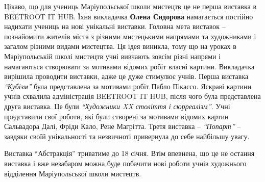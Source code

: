 Цікаво, що  для учениць Маріупольської школи мистецтв це не перша виставка в
BEETROOT IT HUB. Їхня викладачка \textbf{Олена Сидорова} намагається постійно надихати
учениць на нові унікальні виставки. Головна мета виставок – познайомити жителів
міста з різними мистецькими  напрямами та художниками і загалом різними видами
мистецтва. Ця ідея виникла, тому що на уроках в Маріупольській школі мистецтв
учні вивчають зовсім різні напрями і намагаються створювати за мотивами відомих
робіт власні картини. Викладачка вирішила проводити виставки, адже це дуже
стимулює учнів. Перша виставка \emph{\enquote{Кубізм}} була представлена за мотивами
робіт Пабло Пікассо. Яскраві картини учнів схвалила адміністрація BEETROOT IT
HUB, після чого була представлена друга виставка. Це були \emph{\enquote{Художники XX
століття і сюрреалізм}}. Учні представили свої роботи, які були створені за
мотивами відомих картин Сальвадора Далі, Фріди Кало, Рене Магрітта. Третя
виставка – \emph{\enquote{Попарт}} – завдяки своїй унікальності та незвичноті
привернула до себе найбільшу увагу.


Виставка \enquote{Абстракція} триватиме до 18 січня. Втім впевнена, що це не
остання виставка  і вже незабаром можна буде побачити нові роботи учнів
художнього відділення Маріупольської школи мистецтв.

